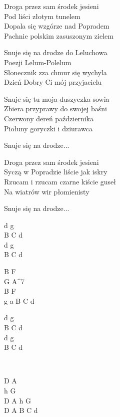 \begin{text}
    Droga przez sam środek jesieni\\
    Pod liści złotym tunelem\\
    Dopala się wzgórze nad Popradem\\
    Pachnie polskim zasuszonym zielem

    \vin Snuje się na drodze do Leluchowa\\
    \vin Poezji Lelum-Polelum\\
    \vin Słonecznik zza chmur się wychyla\\
    \vin Dzień Dobry Ci mój przyjacielu

    Snuje się tu moja duszyczka sowia\\
    Zbiera przyprawy do swojej baśni\\
    Czerwony dereń października\\
    Piołuny goryczki i dziurawca
	
	\vin Snuje się na drodze...

    Droga przez sam środek jesieni\\
    Syczą w Popradzie liście jak iskry\\
    Rzucam i rzucam czarne kiście guseł\\
    Na wiatrów wir płomienisty
	
	\vin Snuje się na drodze...
\end{text}
\begin{chord}
    d g\\
    B C d\\
    d g\\
    B C d

    B F\\
    G A^7\\
    B F\\
    g a B C d

    d g\\
    B C d\\
    d g\\
    B C d

    ~

    D A\\
    h G\\
    D A h G\\
    D A B C d
\end{chord}